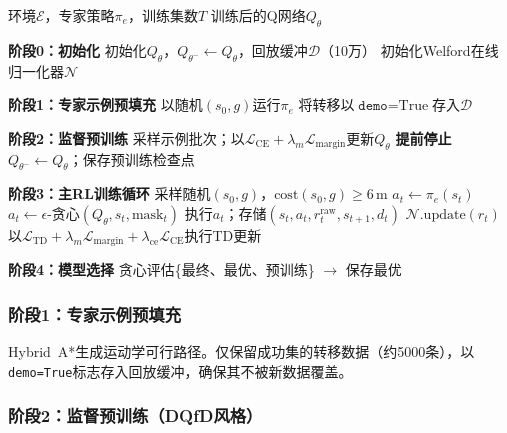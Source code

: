 \documentclass[conference]{IEEEtran}
\newcommand{\Qnet}{Q_\theta}
\newcommand{\Qtarget}{Q_{\theta^-}}
\begin{document}
\begin{algorithm}[t]
\caption{森林导航四阶段DQN训练流水线}
\label{alg:training}
\footnotesize
\begin{algorithmic}[1]
\Require 环境$\mathcal{E}$，专家策略$\pi_e$，训练集数$T$
\Ensure 训练后的Q网络$\Qnet$

\Statex \textbf{阶段0：初始化}
\State 初始化$\Qnet$，$\Qtarget \leftarrow \Qnet$，回放缓冲$\mathcal{D}$（10万）
\State 初始化Welford在线归一化器$\mathcal{N}$

\Statex \textbf{阶段1：专家示例预填充}
    \State 以随机$(s_0, g)$运行$\pi_e$
        \State 将转移以$\texttt{demo}=\text{True}$存入$\mathcal{D}$
    \EndIf
\EndWhile

\Statex \textbf{阶段2：监督预训练}
    \State 采样示例批次；以$\mathcal{L}_{\text{CE}} + \lambda_m \mathcal{L}_{\text{margin}}$更新$\Qnet$
     \textbf{提前停止} \EndIf
\EndFor
\State $\Qtarget \leftarrow \Qnet$；保存预训练检查点

\Statex \textbf{阶段3：主RL训练循环}
    \State 采样随机$(s_0, g)$，$\text{cost}(s_0, g) \geq 6$\,m
            \State $a_t \leftarrow \pi_e(s_t)$ 
        \Else
            \State $a_t \leftarrow \epsilon\text{-贪心}(\Qnet, s_t, \text{mask}_t)$
        \EndIf
        \State 执行$a_t$；存储$(s_t, a_t, r_t^{\text{raw}}, s_{t+1}, d_t)$
        \State $\mathcal{N}.\text{update}(r_t)$
    \EndFor
    \State 以$\mathcal{L}_{\text{TD}} + \lambda_m \mathcal{L}_{\text{margin}} + \lambda_{\text{ce}} \mathcal{L}_{\text{CE}}$执行TD更新
\EndFor

\Statex \textbf{阶段4：模型选择}
\State 贪心评估\{最终、最优、预训练\} $\rightarrow$ 保存最优
\end{algorithmic}
\end{algorithm}

\subsubsection{阶段1：专家示例预填充}

Hybrid~A*生成运动学可行路径。仅保留成功集的转移数据（约5000条），以\texttt{demo=True}标志存入回放缓冲，确保其不被新数据覆盖。

\subsubsection{阶段2：监督预训练（DQfD风格）}
\end{document}
